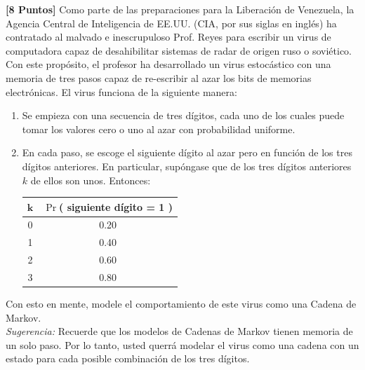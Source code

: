 \documentclass[ a4paper, twoside, 11pt]{article}
\begin{document}
\begin{problem}
\textbf{[8 Puntos]} Como parte de las preparaciones para la Liberaci\'on de Venezuela, la Agencia Central de Inteligencia de EE.UU. (CIA, por sus siglas en ingl\'es) ha contratado al malvado e inescrupuloso Prof. Reyes para escribir un virus de computadora capaz de desahibilitar sistemas de radar de origen ruso o sovi\'etico. Con este prop\'osito, el profesor ha desarrollado un virus estoc\'astico con una memoria de tres pasos capaz de re-escribir al azar los bits de memorias electr\'onicas. El virus funciona de la siguiente manera: 
\begin{enumerate}
\item Se empieza con una secuencia de tres d\'igitos, cada uno de los cuales puede tomar los valores cero o uno al azar con probabilidad uniforme. 
\item En cada paso, se escoge el siguiente d\'igito al azar pero en funci\'on de los tres d\'igitos anteriores. En particular, sup\'ongase que de los tres d\'igitos anteriores $k$ de ellos son unos. Entonces: 

\begin{table}[H]
\centering
\begin{tabular}{|c|c|}
\hline
$\boldsymbol{k}$ & $\Pr$( siguiente d\'igito = 1 ) \\ \hline
0 & 0.20 \\ \hline
1 & 0.40 \\ \hline
2 & 0.60 \\ \hline
3 & 0.80 \\ \hline
\end{tabular}
\end{table}

\end{enumerate}

Con esto en mente, modele el comportamiento de este virus como una Cadena de Markov. \\[1ex] \emph{Sugerencia:} Recuerde que los modelos de Cadenas de Markov tienen memoria de un solo paso. Por lo tanto, usted querr\'a modelar el virus como una cadena con un estado para cada posible combinaci\'on de los tres d\'igitos.

\QED

\end{problem}
\fullskip
\end{document}
